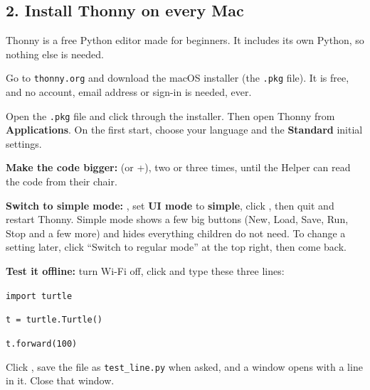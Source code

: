 \documentclass[track=junior,level=3,teacher]{kidscode}
\begin{document}
\subsection{2. Install Thonny on every Mac}
Thonny is a free Python editor made for beginners. It includes its own Python, so nothing else is needed.
\begin{checklist}
  \item Go to \texttt{thonny.org} and download the macOS installer (the \texttt{.pkg} file). It is
        free, and no account, email address or sign-in is needed, ever.
  \item Open the \texttt{.pkg} file and click through the installer. Then open Thonny from
        \textbf{Applications}. On the first start, choose your language and the \textbf{Standard}
        initial settings.
  \item \textbf{Make the code bigger:}  (or +\keys{+}),
        two or three times, until the Helper can read the code from their chair.
  \item \textbf{Switch to simple mode:} , set \textbf{UI mode}
        to \textbf{simple}, click , then quit and restart Thonny. Simple mode shows a few big
        buttons (New, Load, Save, Run, Stop and a few more) and hides everything children do not need.
        To change a setting later, click \enquote{Switch to regular mode} at the top right, then come back.
  \item \textbf{Test it offline:} turn Wi-Fi off, click  and type these three lines:\par
        \texttt{import turtle}\par\texttt{t = turtle.Turtle()}\par\texttt{t.forward(100)}\par
        Click , save the file as \texttt{test\_line.py} when asked, and a window opens with a
        line in it. Close that window.
\end{checklist}
\end{document}
